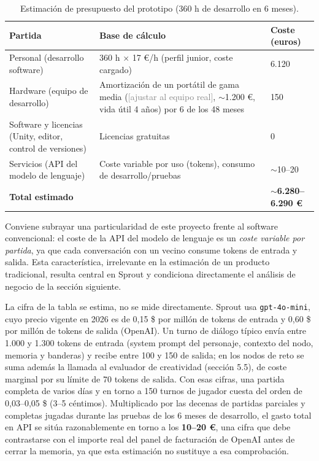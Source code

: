 \documentclass[12pt,twoside,titlepage]{report}
\begin{document}
\begin{table}[h]
  \centering
  \caption{Estimación de presupuesto del prototipo (360 h de desarrollo en 6 meses).}
  \label{tab:presupuesto}
  \begin{footnotesize}
  \renewcommand{\arraystretch}{1.3}
  \begin{tabular}{p{6.5cm}p{4cm}p{2.5cm}}
    \hline
    \textbf{Partida} & \textbf{Base de cálculo} & \textbf{Coste (euros)} \\
    \hline
    Personal (desarrollo software) & 360 h $\times$ 17 €/h (perfil junior, coste cargado) & 6.120 \\
    \hline
    Hardware (equipo de desarrollo) & Amortización de un portátil de gama media (\textcolor{gray}{[ajustar al equipo real]}, $\sim$1.200 €, vida útil 4 años) por 6 de los 48 meses & 150 \\
    \hline
    Software y licencias (Unity, editor, control de versiones) & Licencias gratuitas & 0 \\
    \hline
    Servicios (API del modelo de lenguaje) & Coste variable por uso (tokens), consumo de desarrollo/pruebas & $\sim$10--20 \\
    \hline
    \textbf{Total estimado} & & \textbf{$\sim$6.280--6.290 €} \\
    \hline
  \end{tabular}
  \end{footnotesize}
\end{table}

Conviene subrayar una particularidad de este proyecto frente al software convencional: el coste de la API del modelo de lenguaje es un \textit{coste variable por partida}, ya que cada conversación con un vecino consume tokens de entrada y salida. Esta característica, irrelevante en la estimación de un producto tradicional, resulta central en Sprout y condiciona directamente el análisis de negocio de la sección siguiente.

La cifra de la tabla se estima, no se mide directamente. Sprout usa \texttt{gpt-4o-mini}, cuyo precio vigente en 2026 es de 0,15 \$ por millón de tokens de entrada y 0,60 \$ por millón de tokens de salida (OpenAI). Un turno de diálogo típico envía entre 1.000 y 1.300 tokens de entrada (system prompt del personaje, contexto del nodo, memoria y banderas) y recibe entre 100 y 150 de salida; en los nodos de reto se suma además la llamada al evaluador de creatividad (sección 5.5), de coste marginal por su límite de 70 tokens de salida. Con esas cifras, una partida completa de varios días y en torno a 150 turnos de jugador cuesta del orden de 0,03--0,05 \$ (3--5 céntimos). Multiplicado por las decenas de partidas parciales y completas jugadas durante las pruebas de los 6 meses de desarrollo, el gasto total en API se sitúa razonablemente en torno a los \textbf{10--20 €}, una cifra que debe contrastarse con el importe real del panel de facturación de OpenAI antes de cerrar la memoria, ya que esta estimación no sustituye a esa comprobación.
\end{document}
